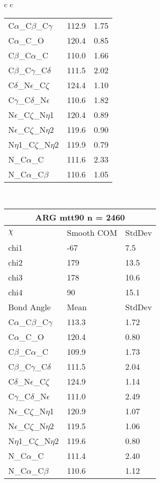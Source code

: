 \begin{longtable}{ c c }
\begin{tabular}{ l l l }
  C$\alpha$\_C$\beta$\_C$\gamma$ & 112.9 & 1.75\\
  C$\alpha$\_C\_O & 120.4 & 0.85\\
  C$\beta$\_C$\alpha$\_C & 110.0 & 1.66\\
  C$\beta$\_C$\gamma$\_C$\delta$ & 111.5 & 2.02\\
  C$\delta$\_N$\epsilon$\_C$\zeta$ & 124.4 & 1.10\\
  C$\gamma$\_C$\delta$\_N$\epsilon$ & 110.6 & 1.82\\
  N$\epsilon$\_C$\zeta$\_N$\eta$1 & 120.4 & 0.89\\
  N$\epsilon$\_C$\zeta$\_N$\eta$2 & 119.6 & 0.90\\
  N$\eta$1\_C$\zeta$\_N$\eta$2 & 119.9 & 0.79\\
  N\_C$\alpha$\_C & 111.6 & 2.33\\
  N\_C$\alpha$\_C$\beta$ & 110.6 & 1.05\\
  \bottomrule
  \end{tabular}
  \\
  \begin{tabular}{ l l l }
  \toprule
  \multicolumn{3}{c}{ARG \textbf{mtt90} n = 2460} \\ \toprule
  $\chi$       & Smooth COM & StdDev \\ \midrule
  chi1 & -67 & 7.5 \\ 
  chi2 & 179 & 13.5 \\ 
  chi3 & 178 & 10.6 \\ 
  chi4 & 90 & 15.1 \\ \midrule
  Bond Angle   & Mean     & StdDev \\ \midrule
  C$\alpha$\_C$\beta$\_C$\gamma$ & 113.3 & 1.72\\
  C$\alpha$\_C\_O & 120.4 & 0.80\\
  C$\beta$\_C$\alpha$\_C & 109.9 & 1.73\\
  C$\beta$\_C$\gamma$\_C$\delta$ & 111.5 & 2.04\\
  C$\delta$\_N$\epsilon$\_C$\zeta$ & 124.9 & 1.14\\
  C$\gamma$\_C$\delta$\_N$\epsilon$ & 111.0 & 2.49\\
  N$\epsilon$\_C$\zeta$\_N$\eta$1 & 120.9 & 1.07\\
  N$\epsilon$\_C$\zeta$\_N$\eta$2 & 119.5 & 1.06\\
  N$\eta$1\_C$\zeta$\_N$\eta$2 & 119.6 & 0.80\\
  N\_C$\alpha$\_C & 111.4 & 2.40\\
  N\_C$\alpha$\_C$\beta$ & 110.6 & 1.12\\

\end{tabular}
\end{longtable}

